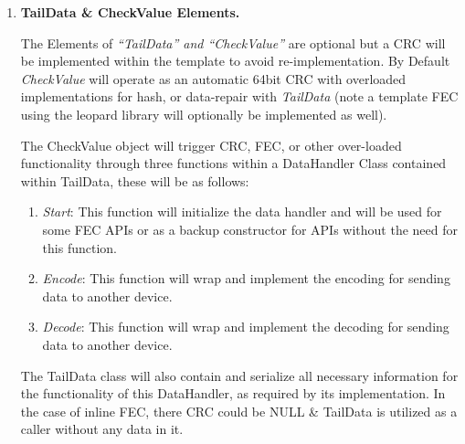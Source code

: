 \documentclass{article}
\begin{document}
\begin{enumerate}
    \pagebreak
    

    \item \textbf{TailData \& CheckValue Elements.}
    
    The Elements of \textit{``TailData'' and ``CheckValue''} are optional but a CRC will be implemented within the template to avoid re-implementation. By Default \textit{CheckValue} will operate as an automatic 64bit CRC with overloaded implementations  for hash, or data-repair with \textit{TailData} (note a template FEC using the leopard library will optionally be implemented as well).
    
    The CheckValue object will trigger CRC, FEC, or other over-loaded functionality through three functions within a DataHandler Class contained within TailData, these will be as follows:
    \begin{enumerate}
        \item \textit{Start}: This function will initialize the data handler and will be used for some FEC APIs or as a backup constructor for APIs without the need for this function.
        \item \textit{Encode}: This function will wrap and implement the encoding for sending data to another device.
        \item \textit{Decode}: This function will wrap and implement the decoding for sending data to another device.
    \end{enumerate}

    The TailData class will also contain and serialize all necessary information for the functionality of this DataHandler, as required by its implementation. In the case of inline FEC, there CRC could be NULL \& TailData is utilized as a caller without any data in it.

\end{enumerate}
\end{document}
